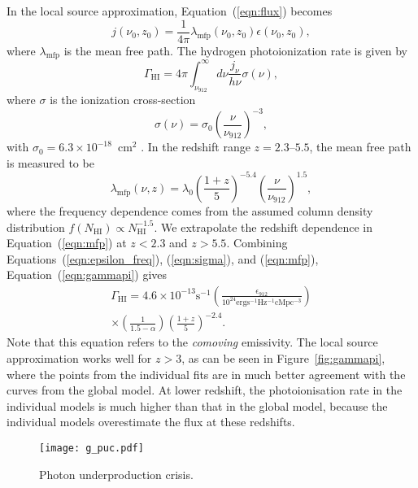\documentclass[a4paper,fleqn,usenatbib]{mnras}
\begin{document}
In the local source approximation, Equation~(\ref{eqn:flux}) becomes
\begin{equation}
  j(\nu_0, z_0) = \frac{1}{4\pi}\lambda_\mathrm{mfp}(\nu_0, z_0)\epsilon(\nu_0, z_0),
\end{equation}
where $\lambda_\mathrm{mfp}$ is the mean free path.  The hydrogen
photoionization rate is given by
\begin{equation}
  \Gamma_\mathrm{HI}=4\pi\int_{\nu_{912}}^\infty d\nu \frac{j_\nu}{h\nu} \sigma(\nu),
  \label{eqn:gammapi}
\end{equation}
where $\sigma$ is the ionization cross-section
\begin{equation}
  \sigma(\nu) = \sigma_0\left(\frac{\nu}{\nu_{912}}\right)^{-3},
  \label{eqn:sigma}
\end{equation}
with $\sigma_0=6.3\times 10^{-18}$~cm$^2$ \citep{2006agna.book.....O}.
In the redshift range $z=2.3$--$5.5$, the mean free path is measured
to be \citep{2014MNRAS.445.1745W}
\begin{equation}
  \lambda_\mathrm{mfp}(\nu, z)= \lambda_0\left(\frac{1+z}{5}\right)^{-5.4}\left(\frac{\nu}{\nu_{912}}\right)^{1.5},
  \label{eqn:mfp}
\end{equation}
where the frequency dependence comes from the assumed column density
distribution $f(N_\mathrm{HI})\propto N_\mathrm{HI}^{-1.5}$.  We
extrapolate the redshift dependence in Equation~(\ref{eqn:mfp}) at
$z<2.3$ and $z>5.5$.  Combining Equations~(\ref{eqn:epsilon_freq}),
(\ref{eqn:sigma}), and (\ref{eqn:mfp}), Equation~(\ref{eqn:gammapi})
gives
\begin{multline}
  \Gamma_\mathrm{HI}=4.6\times 10^{-13} \mathrm{s}^{-1} \left(\frac{\epsilon_{912}}{10^{24}\mathrm{erg s^{-1} Hz^{-1} cMpc^{-3}}}\right)\\
  \times\left(\frac{1}{1.5-\alpha}\right)\left(\frac{1+z}{5}\right)^{-2.4}.
\end{multline}
Note that this equation refers to the \emph{comoving} emissivity.  The
local source approximation works well for $z>3$, as can be seen in
Figure~\ref{fig:gammapi}, where the points from the individual fits
are in much better agreement with the curves from the global model.
At lower redshift, the photoionisation rate in the individual models
is much higher than that in the global model, because the individual
models overestimate the flux at these redshifts. 

\begin{figure}
  \begin{center}
    \texttt{[image: g\_puc.pdf]}
  \end{center}
  \caption{Photon underproduction crisis.}
\end{figure}
\end{document}
